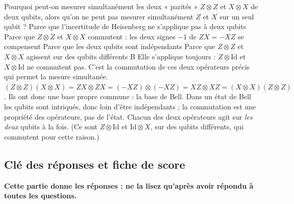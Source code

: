   {Pourquoi peut-on mesurer simultanément les deux « parités » $Z\otimes Z$ et $X\otimes X$ de deux qubits, alors qu'on ne peut pas mesurer simultanément $Z$ et $X$ sur un seul qubit ?}
  {Parce que l'incertitude de Heisenberg ne s'applique pas à deux qubits}
  {Parce que $Z\otimes Z$ et $X\otimes X$ commutent : les deux signes $-1$ de $ZX=-XZ$ se compensent}
  {Parce que les deux qubits sont indépendants}
  {Parce que $Z\otimes Z$ et $X\otimes X$ agissent sur des qubits différents}
  {B}
\qcmx
  {Elle s'applique toujours : $Z\otimes\mathrm{Id}$ et $X\otimes\mathrm{Id}$ ne commutent pas. C'est la commutation de ces deux opérateurs précis qui permet la mesure simultanée.}
  {$(Z\otimes Z)(X\otimes X)=ZX\otimes ZX=(-XZ)\otimes(-XZ)=XZ\otimes XZ=(X\otimes X)(Z\otimes Z)$. Ils ont donc une base propre commune : la base de Bell.}
  {Dans un état de Bell les qubits sont intriqués, donc loin d'être indépendants ; la commutation est une propriété des opérateurs, pas de l'état.}
  {Chacun des deux opérateurs agit sur \emph{les deux} qubits à la fois. (Ce sont $Z\otimes\mathrm{Id}$ et $\mathrm{Id}\otimes X$, sur des qubits différents, qui commutent pour cette raison.)}

\label{qcm:fin}

\clearpage
\ifqcmcorrige

\subsection{Clé des réponses et fiche de score}\label{sec:qcm-cle}
\noindent\textbf{Cette partie donne les réponses : ne la lisez qu'après avoir répondu à toutes les
questions.}

